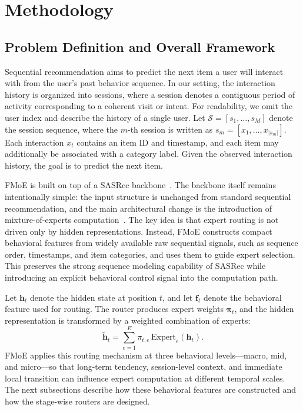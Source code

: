 \documentclass[sigconf,anonymous,review]{acmart}
\begin{document}
\section{Methodology}
\label{sec:method}

\subsection{Problem Definition and Overall Framework}
\label{sec:problem-framework}

Sequential recommendation aims to predict the next item a user will interact with from the user's past behavior sequence. In our setting, the interaction history is organized into sessions, where a session denotes a contiguous period of activity corresponding to a coherent visit or intent. For readability, we omit the user index and describe the history of a single user. Let $\mathcal{S} = [s_1, \dots, s_M]$ denote the session sequence, where the $m$-th session is written as $s_m = [x_1, \dots, x_{|s_m|}]$. Each interaction $x_t$ contains an item ID and timestamp, and each item may additionally be associated with a category label. Given the observed interaction history, the goal is to predict the next item.

FMoE is built on top of a SASRec backbone~\cite{kang2018sasrec}. The backbone itself remains intentionally simple: the input structure is unchanged from standard sequential recommendation, and the main architectural change is the introduction of mixture-of-experts computation~\cite{jordan1994hme,shazeer2017moe,fedus2022switch}. The key idea is that expert routing is not driven only by hidden representations. Instead, FMoE constructs compact behavioral features from widely available raw sequential signals, such as sequence order, timestamps, and item categories, and uses them to guide expert selection. This preserves the strong sequence modeling capability of SASRec while introducing an explicit behavioral control signal into the computation path.

Let $\mathbf{h}_t$ denote the hidden state at position $t$, and let $\mathbf{f}_t$ denote the behavioral feature used for routing. The router produces expert weights $\boldsymbol{\pi}_t$, and the hidden representation is transformed by a weighted combination of experts:
\[
\tilde{\mathbf{h}}_t
=
\sum_{e=1}^{E}
\pi_{t,e}\,\mathrm{Expert}_e(\mathbf{h}_t).
\]
FMoE applies this routing mechanism at three behavioral levels---macro, mid, and micro---so that long-term tendency, session-level context, and immediate local transition can influence expert computation at different temporal scales. The next subsections describe how these behavioral features are constructed and how the stage-wise routers are designed.
\end{document}
